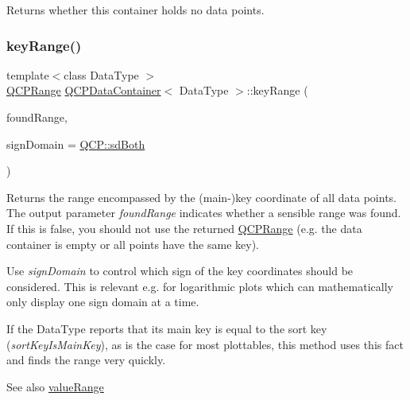 Returns whether this container holds no data points. \mbox{\label{class_q_c_p_data_container_aba6e1a93c21ccc56a432b4a02c9d0ed2}} 
\subsubsection{\texorpdfstring{key\+Range()}{keyRange()}}
{\footnotesize\ttfamily template$<$class Data\+Type $>$ \\
\mbox{\hyperlink{class_q_c_p_range}{Q\+C\+P\+Range}} \mbox{\hyperlink{class_q_c_p_data_container}{Q\+C\+P\+Data\+Container}}$<$ Data\+Type $>$\+::key\+Range (\begin{DoxyParamCaption}\item[{bool \&}]{found\+Range,  }\item[{\mbox{\hyperlink{namespace_q_c_p_afd50e7cf431af385614987d8553ff8a9}{Q\+C\+P\+::\+Sign\+Domain}}}]{sign\+Domain = {\ttfamily \mbox{\hyperlink{namespace_q_c_p_afd50e7cf431af385614987d8553ff8a9aa38352ef02d51ddfa4399d9551566e24}{Q\+C\+P\+::sd\+Both}}} }\end{DoxyParamCaption})}

Returns the range encompassed by the (main-\/)key coordinate of all data points. The output parameter {\itshape found\+Range} indicates whether a sensible range was found. If this is false, you should not use the returned \mbox{\hyperlink{class_q_c_p_range}{Q\+C\+P\+Range}} (e.\+g. the data container is empty or all points have the same key).

Use {\itshape sign\+Domain} to control which sign of the key coordinates should be considered. This is relevant e.\+g. for logarithmic plots which can mathematically only display one sign domain at a time.

If the Data\+Type reports that its main key is equal to the sort key ({\itshape sort\+Key\+Is\+Main\+Key}), as is the case for most plottables, this method uses this fact and finds the range very quickly.

\begin{DoxySeeAlso}{See also}
\mbox{\hyperlink{class_q_c_p_data_container_a35a102dc2424d1228fc374d9313efbe9}{value\+Range}} 
\end{DoxySeeAlso}
\mbox{\label{class_q_c_p_data_container_aa1b36f5ae86a5a5a0b92141d3a0945c4}} 
